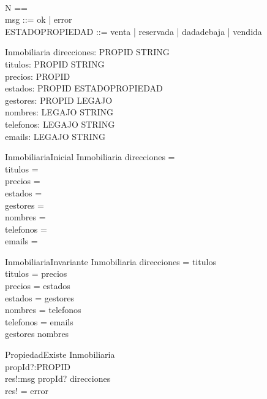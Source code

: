 \begin{zed}
 \\
N == \nat \\
msg ::= ok | error \\
ESTADOPROPIEDAD ::= venta | reservada | dadadebaja | vendida
\end{zed}

\begin{schema}{Inmobiliaria}
direcciones: PROPID \pfun STRING \\
titulos: PROPID \pfun STRING \\
precios: PROPID \pfun \nat \\
estados: PROPID \pfun ESTADOPROPIEDAD \\
gestores: PROPID \pfun LEGAJO \\
nombres: LEGAJO \pfun STRING \\
telefonos: LEGAJO \pfun STRING \\
emails: LEGAJO \pfun STRING
\end{schema}

\begin{schema}{InmobiliariaInicial}
Inmobiliaria
\where
direcciones = \emptyset  \\
titulos = \emptyset  \\
precios = \emptyset  \\
estados = \emptyset  \\
gestores = \emptyset  \\
nombres = \emptyset  \\
telefonos = \emptyset  \\
emails = \emptyset
\end{schema}

\begin{schema}{InmobiliariaInvariante}
Inmobiliaria
\where
\dom direcciones = \dom titulos \\
\dom titulos = \dom precios \\
\dom precios = \dom estados \\
\dom estados = \dom gestores \\
\dom nombres = \dom telefonos \\
\dom telefonos = \dom emails \\
\ran gestores \subseteq \dom nombres
\end{schema}

\begin{schema}{PropiedadExiste}
\Xi Inmobiliaria \\
propId?:PROPID \\
res!:msg
\where
propId? \in \dom direcciones \\
res! = error
\end{schema}

